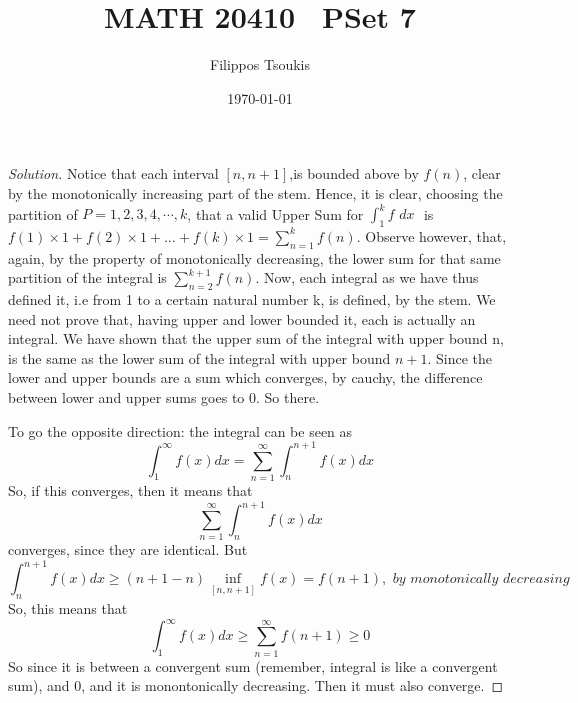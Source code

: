 \documentclass{article}
\newenvironment{problem}[2][Problem]{\begin{trivlist}
\item[\hskip \labelsep {\bfseries #1}\hskip \labelsep {\bfseries #2.}]}{\end{trivlist}}
\newenvironment{solution}{\begin{proof}[Solution]}{\end{proof}}
\begin{document}
\newcommand{\s}[0]{\sin(\theta)}
\newcommand{\cs}[0]{\cos(\theta)}
\newcommand{\spa}[0]{\hspace{1mm}}

\title{MATH 20410 \ PSet 7} %
\author{Filippos Tsoukis} %
\date{\today}
\maketitle

%
%
\begin{problem}{6.8}
\end{problem}

\begin{solution}
Notice that each interval $[n, n+1]$,is bounded above by $f(n)$, clear by the monotonically increasing part of the stem. Hence, it is clear, choosing the partition of $P = {1, 2, 3, 4, \cdots, k}$, that a valid Upper Sum for $\int_{1}^{k}f \textit{ dx }$  is $f(1)\times 1 +f(2)\times 1 + \dots +f(k)\times 1 = \sum_{n=1}^{k} f(n) $. Observe however, that, again, by the property of monotonically decreasing, the lower sum for that same partition of the integral is $\sum_{n=2}^{k+1}f(n)$. Now, each integral as we have thus defined it, i.e from 1 to a certain natural number k, is defined, by the stem. We need not prove that, having upper and lower bounded it, each is actually an integral. We have shown that the upper sum of the integral with upper bound n, is the same as the lower sum of the integral with upper bound $n+1$. Since the lower and upper bounds are a sum which converges, by cauchy, the difference between lower and upper sums goes to 0. So there. 

To go the opposite direction: the integral can be seen as \[
	\int_{1}^{\infty}f(x)dx = \sum_{n=1}^{\infty} \int_{n}^{n+1}f(x)dx  
\]
So, if this converges, then it means that \[
	\sum_{n=1}^{\infty} \int_{n}^{n+1}f(x)dx 
\]
converges, since they are identical. But \[
	\int_{n}^{n+1}f(x)dx \geq (n+1 - n) \inf_{[n,n+1]}f(x) =f(n+1), \textit{ by monotonically decreasing }   
\]
So, this means that \[
	\int_{1}^{\infty}f(x)dx \geq \sum_{n=1}^{\infty} f(n+1) \geq 0
\]
So since it is between a convergent sum (remember, integral is like a convergent sum), and 0, and it is monontonically decreasing. Then it must also converge.
\end{solution}
\end{document}
